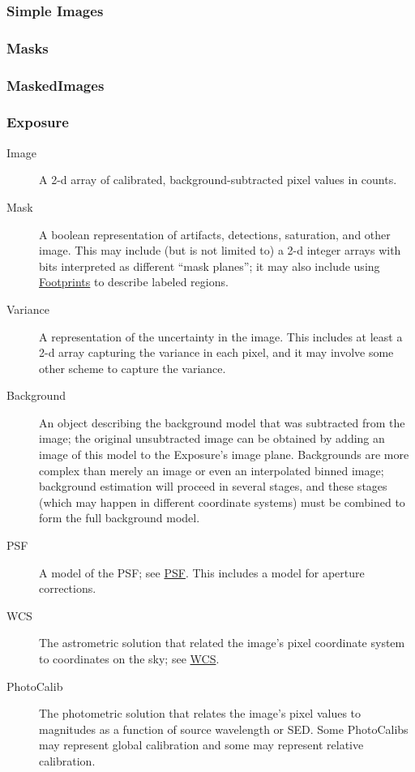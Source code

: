 \subsubsection{Simple Images}
\label{sec:spImagesSimple}

\subsubsection{Masks}
\label{sec:spImagesMasks}

\subsubsection{MaskedImages}
\label{sec:spImagesMaskedImages}

\subsubsection{Exposure}
\label{sec:spImagesExposure}

\begin{description}
\item[Image] A 2-d array of calibrated, background-subtracted pixel values in counts.
\item[Mask] A boolean representation of artifacts, detections, saturation, and other image.  This may include (but is not limited to) a 2-d integer arrays with bits interpreted as different ``mask planes''; it may also include using \hyperref[sec:spFootprints]{Footprints} to describe labeled regions.
\item[Variance] A representation of the uncertainty in the image.  This includes at least a 2-d array capturing the variance in each pixel, and it may involve some other scheme to capture the variance.
\item[Background] An object describing the background model that was subtracted from the image; the original unsubtracted image can be obtained by adding an image of this model to the Exposure's image plane.  Backgrounds are more complex than merely an image or even an interpolated binned image; background estimation will proceed in several stages, and these stages (which may happen in different coordinate systems) must be combined to form the full background model.
\item[PSF] A model of the PSF; see \hyperref[sec:spPSF]{PSF}.  This includes a model for aperture corrections.
\item[WCS] The astrometric solution that related the image's pixel coordinate system to coordinates on the sky; see \hyperref[sec:spWCS]{WCS}.
\item[PhotoCalib] The photometric solution that relates the image's pixel values to magnitudes as a function of source wavelength or SED.  Some PhotoCalibs may represent global calibration and some may represent relative calibration.
\end{description}

